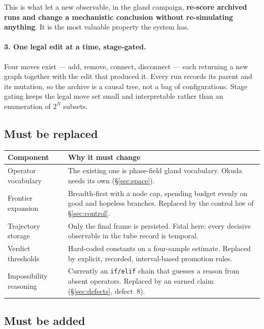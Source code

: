 \documentclass[11pt]{article}
\newcommand{\code}[1]{\texttt{#1}}
\begin{document}
This is what let a new observable, in the gland campaign, \textbf{re-score archived runs and
change a mechanistic conclusion without re-simulating anything}. It is the most valuable property
the system has.

\paragraph{3. One legal edit at a time, stage-gated.}
Four moves exist --- add, remove, connect, disconnect --- each returning a new graph together with
the edit that produced it. Every run records its parent and its mutation, so the archive is a
causal tree, not a bag of configurations. Stage gating keeps the legal move set small and
interpretable rather than an enumeration of $2^N$ subsets.

\subsection{Must be replaced}

\begin{center}\small
\begin{tabular}{@{}p{4.6cm}p{9.9cm}@{}}
\toprule
\textbf{Component} & \textbf{Why it must change} \\
\midrule
Operator vocabulary & The existing one is phase-field gland vocabulary. Okuda needs its own
(\S\ref{sec:space}). \\
Frontier expansion & Breadth-first with a node cap, spending budget evenly on good and hopeless
branches. Replaced by the control law of \S\ref{sec:control}. \\
Trajectory storage & Only the final frame is persisted. Fatal here: every decisive observable in
the tube record is temporal. \\
Verdict thresholds & Hard-coded constants on a four-sample estimate. Replaced by explicit,
recorded, interval-based promotion rules. \\
Impossibility reasoning & Currently an \code{if/elif} chain that guesses a reason from absent
operators. Replaced by an earned claim (\S\ref{sec:defects}, defect~8). \\
\bottomrule
\end{tabular}
\end{center}

\subsection{Must be added}
\end{document}
